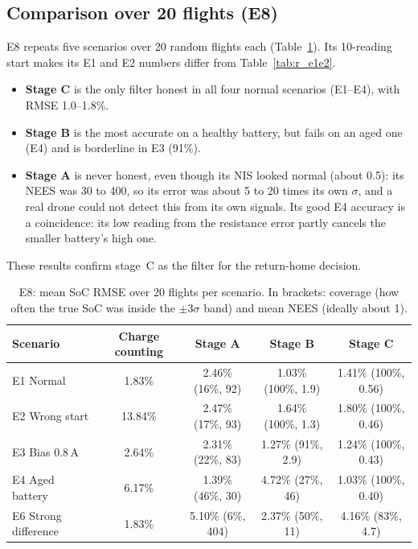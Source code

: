 \subsection{Comparison over 20 flights (E8)}\label{sec:r_e8}

E8 repeats five scenarios over 20 random flights each (Table~\ref{tab:r_e8}). Its 10-reading start makes its E1 and E2 numbers differ from Table~\ref{tab:r_e1e2}.
\begin{itemize}
  \item \textbf{Stage C} is the only filter honest in all four normal scenarios (E1--E4), with RMSE 1.0--1.8\%.
  \item \textbf{Stage B} is the most accurate on a healthy battery, but fails on an aged one (E4) and is borderline in E3 (91\%).
  \item \textbf{Stage A} is never honest, even though its NIS looked normal (about 0.5): its NEES was 30 to 400, so its error was about 5 to 20 times its own $\sigma$, and a real drone could not detect this from its own signals. Its good E4 accuracy is a coincidence: its low reading from the resistance error partly cancels the smaller battery's high one.
\end{itemize}
These results confirm stage~C as the filter for the return-home decision.

\begin{table}[htbp]
  \centering
  \caption[E8: mean SoC RMSE and honesty.]{E8: mean SoC RMSE over 20 flights per scenario. In brackets: coverage (how often the true SoC was inside the $\pm 3\sigma$ band) and mean NEES (ideally about 1).}
  \label{tab:r_e8}
  \footnotesize
  \setlength{\tabcolsep}{4pt}
  \begin{tabular}{@{}lcccc@{}}
    \toprule
    Scenario & Charge counting & Stage A & Stage B & Stage C \\
    \midrule
    E1 Normal           & 1.83\%  & 2.46\% (16\%, 92)  & 1.03\% (100\%, 1.9) & 1.41\% (100\%, 0.56) \\
    E2 Wrong start      & 13.84\% & 2.47\% (17\%, 93)  & 1.64\% (100\%, 1.3) & 1.80\% (100\%, 0.46) \\
    E3 Bias 0.8\,A      & 2.64\%  & 2.31\% (22\%, 83)  & 1.27\% (91\%, 2.9)  & 1.24\% (100\%, 0.43) \\
    E4 Aged battery     & 6.17\%  & 1.39\% (46\%, 30)  & 4.72\% (27\%, 46)   & 1.03\% (100\%, 0.40) \\
    E6 Strong difference & 1.83\% & 5.10\% (6\%, 404)  & 2.37\% (50\%, 11)   & 4.16\% (83\%, 4.7) \\
    \bottomrule
  \end{tabular}
\end{table}

